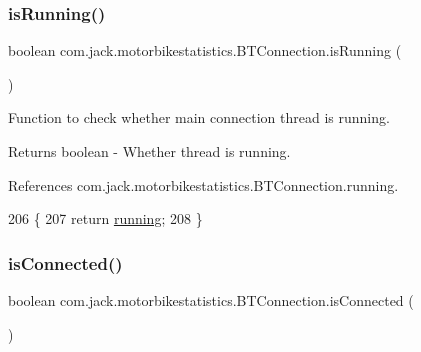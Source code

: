 \mbox{\label{classcom_1_1jack_1_1motorbikestatistics_1_1_b_t_connection_a17b07494b0e7cba2e550054d7b47e309}} 
\subsubsection{\texorpdfstring{is\+Running()}{isRunning()}}
{\footnotesize\ttfamily boolean com.\+jack.\+motorbikestatistics.\+B\+T\+Connection.\+is\+Running (\begin{DoxyParamCaption}{ }\end{DoxyParamCaption})\hspace{0.3cm}{\ttfamily [inline]}}



Function to check whether main connection thread is running. 

\begin{DoxyReturn}{Returns}
boolean -\/ Whether thread is running. 
\end{DoxyReturn}


References com.\+jack.\+motorbikestatistics.\+B\+T\+Connection.\+running.


\begin{DoxyCode}
206                                \{
207         \textcolor{keywordflow}{return} \hyperlink{classcom_1_1jack_1_1motorbikestatistics_1_1_b_t_connection_a6193b7b92b7f2905a3a43d63db40aba8}{running};
208     \}
\end{DoxyCode}
\mbox{\label{classcom_1_1jack_1_1motorbikestatistics_1_1_b_t_connection_a22f33e46d9f460d78865d4c63b645357}} 
\subsubsection{\texorpdfstring{is\+Connected()}{isConnected()}}
{\footnotesize\ttfamily boolean com.\+jack.\+motorbikestatistics.\+B\+T\+Connection.\+is\+Connected (\begin{DoxyParamCaption}{ }\end{DoxyParamCaption})\hspace{0.3cm}{\ttfamily [inline]}}



